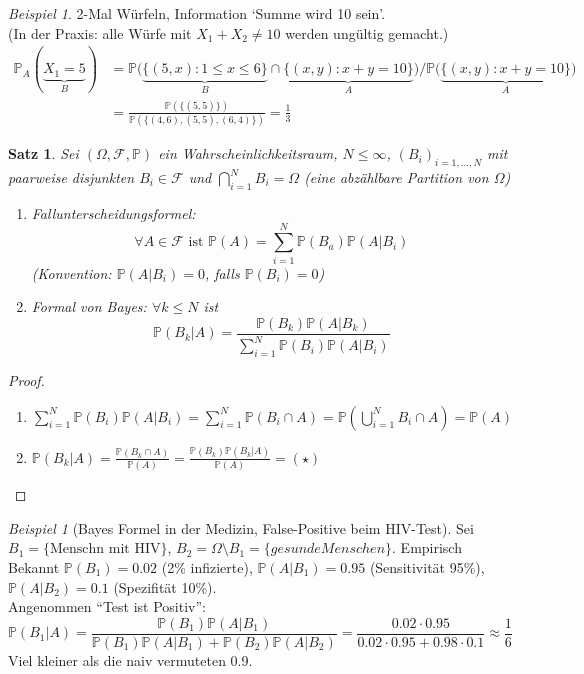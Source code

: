\documentclass[10pt,a4paper]{article}
\newcommand{\Prb}{\mathbb P}
\newcommand{\scF}{\ensuremath{\mathscr{F}}}
\theoremstyle{plain}
\newtheorem{satz}[theorem]{Satz}
\theoremstyle{definition}
\theoremstyle{remark}
\newtheorem{exm}[theorem]{Beispiel}
\newtheorem*{exm*}{Beispiel}
\begin{document}
	\begin{exm*}
		2-Mal Würfeln, Information \enquote*{Summe wird 10 sein}.\\
		(In der Praxis: alle Würfe mit $X_1+X_2\neq 10$ werden ungültig gemacht.)
		\begin{align*}
		\Prb_A(\underbrace{X_1=5}_{B})&=\Prb\big(\underbrace{\{(5,x):1\leq x\leq 6\}}_{B}\cap\underbrace{\{(x,y):x+y=10\}}_{A}\big)/\Prb\big(\underbrace{\{(x,y):x+y=10\}}_{A}\big)\\
		&=\frac{\Prb(\{(5,5)\})}{\Prb(\{(4,6),(5,5),(6,4)\})}=\frac{1}{3}
		\end{align*}
	\end{exm*}

	\begin{satz}\label{0304satz}
		Sei $(\Omega,\scF,\Prb)$ ein Wahrscheinlichkeitsraum, $N\leq \infty$, $(B_i)_{i=1,...,N}$ mit paarweise disjunkten $B_i\in\scF$ und $\bigcap_{i=1}^NB_i=\Omega$ (eine abzählbare Partition von $\Omega$)
		\begin{enumerate}[label=\alph*)]
			\item Fallunterscheidungsformel:\\
			\[\forall A\in\scF\text{ ist }\Prb(A)=\sum_{i=1}^{N}\Prb(B_a)\Prb(A|B_i)\]
			(Konvention: $\Prb(A|B_i)=0$, falls $\Prb(B_i)=0$)
			\item Formal von Bayes: $\forall k\leq N$ ist
			\[\Prb(B_k|A)=\frac{\Prb(B_k)\Prb(A|B_k)}{\sum_{i=1}^{N}\Prb(B_i)\Prb(A|B_i)}\tag{\star}\]
		\end{enumerate}
	\end{satz}
	\begin{proof}
		\begin{enumerate}[label=\alph*)]
			\item $\sum_{i=1}^{N}\Prb(B_i)\Prb(A|B_i)=\sum_{i=1}^{N}\Prb(B_i\cap A)=\Prb\left(\bigcup_{i=1}^NB_i\cap A\right)=\Prb(A)$
			\item $\Prb(B_k|A)=\frac{\Prb(B_k\cap A)}{\Prb(A)}=\frac{\Prb(B_k)\Prb(B_k|A)}{\Prb(A)}=(\star)$
		\end{enumerate}
	\end{proof}

	\begin{exm}[Bayes Formel in der Medizin, False-Positive beim HIV-Test]
		Sei $B_1=\{\text{Menschn mit HIV}\}$, $B_2=\Omega\setminus B_1=\{gesunde Menschen\}$. Empirisch Bekannt $\Prb(B_1)=0.02$ (2\% infizierte), $\Prb(A|B_1)=0.95$ (Sensitivität 95\%), $\Prb(A|B_2)=0.1$ (Spezifität 10\%).\\
		Angenommen \enquote{Test ist Positiv}:
		\[\Prb(B_1|A)=\frac{\Prb(B_1)\Prb(A|B_1)}{\Prb(B_1)\Prb(A|B_1)+\Prb(B_2)\Prb(A|B_2)}=\frac{0.02\cdot0.95}{0.02\cdot0.95+0.98\cdot0.1}\approx\frac{1}{6}\]
		Viel kleiner als die naiv vermuteten 0.9.
	\end{exm}
\end{document}
